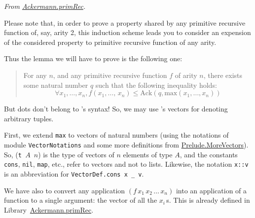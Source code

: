 \vspace{4pt}
\noindent
\emph{From \href{../theories/html/hydras.Ackermann.primRec.html}{Ackermann.primRec}.}






Please note that, in order to prove a property shared by any primitive recursive function of, say, arity 2, this induction scheme  leads you to consider an expension of the considered property to primitive recursive function of any arity.

Thus the lemma we will have to prove is the following one:


  \begin{quote}
    For any $n$, and any primitive recursive function $f$ of  arity $n$, there exists some natural number $q$ such that the following inequality holds:
 \[
  \forall x_1,\dots,x_n, 
      f(x_1,\dots,\,x_n)\leq\textrm{Ack}(q,\textrm{max}(x_1,\dots,x_n))
\]
 \end{quote}


But dots don't belong to \gallina's syntax! So, we may use \coq's vectors for denoting arbitrary tuples.

First, we extend \texttt{max} to vectors of natural numbers (using the notations of module \texttt{VectorNotations} and some more definitions from 
\href{../theories/html/hydras.Prelude.MoreVectors.html}{Prelude.MoreVectors}). So, (\texttt{t\,$A$\,$n$}) is the type of vectors of $n$ elements of type $A$, and the constants \texttt{cons}, \texttt{nil}, \texttt{map}, etc., refer to vectors and not to lists. Likewise, the notation \texttt{x::v} is an abbreviation for
\texttt{VectorDef.cons x \_ v}.











We have also to convert any application
$(f\,x_1\,x_2\,\dots\,x_n)$ into an application of a function 
to a single argument: the vector of all the $x_i$\,s.
This is already defined in 
Library~\href{../theories/html/hydras.Ackermann.primRec.html}{Ackermann.primRec}.


